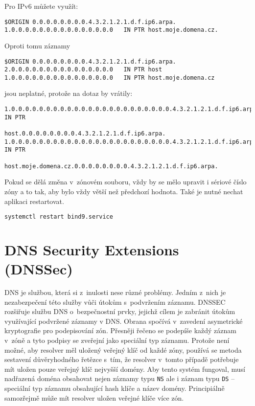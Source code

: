 Pro IPv6 můžete využít:
\begin{verbatim}
$ORIGIN 0.0.0.0.0.0.0.0.4.3.2.1.2.1.d.f.ip6.arpa.
1.0.0.0.0.0.0.0.0.0.0.0.0.0.0.0   IN PTR host.moje.domena.cz.
\end{verbatim}
Oproti tomu záznamy
\begin{verbatim}
$ORIGIN 0.0.0.0.0.0.0.0.4.3.2.1.2.1.d.f.ip6.arpa.
2.0.0.0.0.0.0.0.0.0.0.0.0.0.0.0   IN PTR host
1.0.0.0.0.0.0.0.0.0.0.0.0.0.0.0   IN PTR host.moje.domena.cz
\end{verbatim}
jsou neplatné, protože na dotaz by vrátily:
{\small
\begin{verbatim}
1.0.0.0.0.0.0.0.0.0.0.0.0.0.0.0.0.0.0.0.0.0.0.0.4.3.2.1.2.1.d.f.ip6.arpa. IN PTR
                                              host.0.0.0.0.0.0.0.0.4.3.2.1.2.1.d.f.ip6.arpa.
1.0.0.0.0.0.0.0.0.0.0.0.0.0.0.0.0.0.0.0.0.0.0.0.4.3.2.1.2.1.d.f.ip6.arpa. IN PTR
                               host.moje.domena.cz.0.0.0.0.0.0.0.0.4.3.2.1.2.1.d.f.ip6.arpa.
\end{verbatim}}

Pokud se dělá změna v~zónovém souboru, vždy by se mělo upravit i sériové číslo zóny a to tak, aby bylo vždy větší než předchozí hodnota. Také je nutné nechat aplikaci restartovat.
\begin{verbatim}
systemctl restart bind9.service
\end{verbatim}


\section{DNS Security Extensions (DNSSec)}
\label{dnssec}

DNS je službou, která si z~inulosti nese různé problémy. Jedním z~nich je
nezabezpečení této služby vůči útokům s~podvržením záznamu.
DNSSEC rozšiřuje službu DNS o~bezpečnostní prvky, jejichž cílem je zabránit
útokům využívající podvržené záznamy v DNS. Obrana spočívá v~zavedení
asymetrické kryptografie pro podepisování zón. Přesněji řečeno se podepíše každý
záznam v~zóně a tyto podpisy se zveřejní jako speciální typ záznamu. Protože není možné, aby resolver měl uložený veřejný klíč od každé zóny, používá se metoda sestavení důvěryhodného řetězce s~tím, že resolver v~tomto případě potřebuje mít uložen pouze veřejný klíč nejvyšší domény. Aby tento systém fungoval, musí nadřazená doména obsahovat nejen záznamy typu {\tt NS} ale i záznam typu {\tt DS} -- speciální typ záznamu obsahující hash klíče a název domény. Principiálně samozřejmě může mít resolver uložen veřejné klíče více zón.


